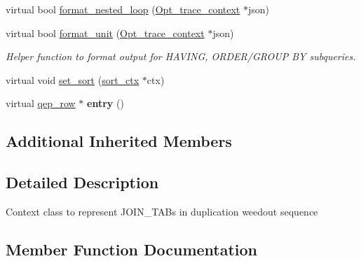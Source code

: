 \begin{DoxyCompactItemize}
\item 
virtual bool \mbox{\hyperlink{classopt__explain__json__namespace_1_1duplication__weedout__ctx_af29378c61f70c4fc201f6b81d9f0129c}{format\+\_\+nested\+\_\+loop}} (\mbox{\hyperlink{classOpt__trace__context}{Opt\+\_\+trace\+\_\+context}} $\ast$json)
\item 
\mbox{\label{classopt__explain__json__namespace_1_1duplication__weedout__ctx_a3ec70f70e3f0f9b15e4e96f5c7b69ae9}} 
virtual bool \mbox{\hyperlink{classopt__explain__json__namespace_1_1duplication__weedout__ctx_a3ec70f70e3f0f9b15e4e96f5c7b69ae9}{format\+\_\+unit}} (\mbox{\hyperlink{classOpt__trace__context}{Opt\+\_\+trace\+\_\+context}} $\ast$json)
\begin{DoxyCompactList}\small\item\em Helper function to format output for H\+A\+V\+I\+NG, O\+R\+D\+E\+R/\+G\+R\+O\+UP BY subqueries. \end{DoxyCompactList}\item 
virtual void \mbox{\hyperlink{classopt__explain__json__namespace_1_1duplication__weedout__ctx_abddc44a12584e636196cbceec61862dd}{set\+\_\+sort}} (\mbox{\hyperlink{classopt__explain__json__namespace_1_1sort__ctx}{sort\+\_\+ctx}} $\ast$ctx)
\item 
\mbox{\label{classopt__explain__json__namespace_1_1duplication__weedout__ctx_a1b66b97e675548c6fc31e50edd0d418c}} 
virtual \mbox{\hyperlink{classqep__row}{qep\+\_\+row}} $\ast$ {\bfseries entry} ()
\end{DoxyCompactItemize}
\subsection*{Additional Inherited Members}


\subsection{Detailed Description}
Context class to represent J\+O\+I\+N\+\_\+\+T\+A\+Bs in duplication weedout sequence 

\subsection{Member Function Documentation}
\mbox{\label{classopt__explain__json__namespace_1_1duplication__weedout__ctx_a6b1d2505d9f83d8c4fcf56d7b58ebca0}} 
